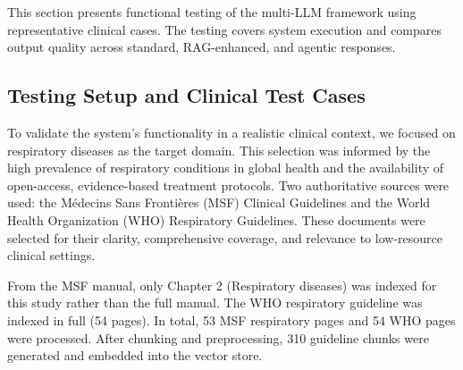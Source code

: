 \documentclass[preprint,12pt]{elsarticle}
\begin{document}
This section presents functional testing of the multi-LLM framework using representative clinical cases. The testing covers system execution and compares output quality across standard, RAG-enhanced, and agentic responses.

\subsection{Testing Setup and Clinical Test Cases}
\label{sec:testing_setup}

To validate the system's functionality in a realistic clinical context, we focused on respiratory diseases as the target domain. This selection was informed by the high prevalence of respiratory conditions in global health and the availability of open-access, evidence-based treatment protocols. Two authoritative sources were used: the M\'edecins Sans Fronti\`eres (MSF) Clinical Guidelines and the World Health Organization (WHO) Respiratory Guidelines. These documents were selected for their clarity, comprehensive coverage, and relevance to low-resource clinical settings.

From the MSF manual, only Chapter 2 (Respiratory diseases) was indexed for this study rather than the full manual. The WHO respiratory guideline was indexed in full (54 pages). In total, 53 MSF respiratory pages and 54 WHO pages were processed. After chunking and preprocessing, 310 guideline chunks were generated and embedded into the vector store.


\begin{table}[!ht]
\centering
\caption{Guideline Sources and Indexed Content Summary}
\label{tab:guideline_summary}
\renewcommand{\arraystretch}{1.2}
\end{table}
\end{document}
